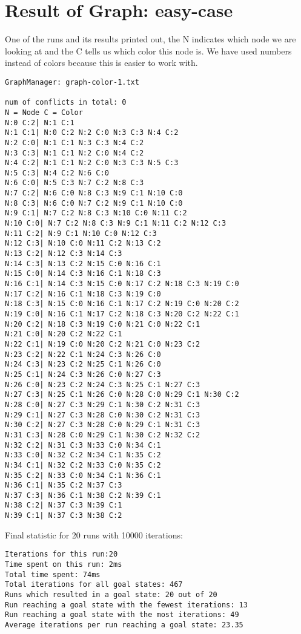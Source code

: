 \documentclass[12pt, a4paper]{article}
\begin{document}
\section{Result of Graph: easy-case}
One of the runs and its results printed out, the N indicates which node we are looking at and the C tells us which color this node is. We have used numbers instead of colors because this is easier to work with.\\
\begin{verbatim}
GraphManager: graph-color-1.txt

num of conflicts in total: 0
N = Node C = Color
N:0 C:2| N:1 C:1 
N:1 C:1| N:0 C:2 N:2 C:0 N:3 C:3 N:4 C:2 
N:2 C:0| N:1 C:1 N:3 C:3 N:4 C:2 
N:3 C:3| N:1 C:1 N:2 C:0 N:4 C:2 
N:4 C:2| N:1 C:1 N:2 C:0 N:3 C:3 N:5 C:3 
N:5 C:3| N:4 C:2 N:6 C:0 
N:6 C:0| N:5 C:3 N:7 C:2 N:8 C:3 
N:7 C:2| N:6 C:0 N:8 C:3 N:9 C:1 N:10 C:0 
N:8 C:3| N:6 C:0 N:7 C:2 N:9 C:1 N:10 C:0 
N:9 C:1| N:7 C:2 N:8 C:3 N:10 C:0 N:11 C:2 
N:10 C:0| N:7 C:2 N:8 C:3 N:9 C:1 N:11 C:2 N:12 C:3 
N:11 C:2| N:9 C:1 N:10 C:0 N:12 C:3 
N:12 C:3| N:10 C:0 N:11 C:2 N:13 C:2 
N:13 C:2| N:12 C:3 N:14 C:3 
N:14 C:3| N:13 C:2 N:15 C:0 N:16 C:1 
N:15 C:0| N:14 C:3 N:16 C:1 N:18 C:3 
N:16 C:1| N:14 C:3 N:15 C:0 N:17 C:2 N:18 C:3 N:19 C:0 
N:17 C:2| N:16 C:1 N:18 C:3 N:19 C:0 
N:18 C:3| N:15 C:0 N:16 C:1 N:17 C:2 N:19 C:0 N:20 C:2 
N:19 C:0| N:16 C:1 N:17 C:2 N:18 C:3 N:20 C:2 N:22 C:1 
N:20 C:2| N:18 C:3 N:19 C:0 N:21 C:0 N:22 C:1 
N:21 C:0| N:20 C:2 N:22 C:1 
N:22 C:1| N:19 C:0 N:20 C:2 N:21 C:0 N:23 C:2 
N:23 C:2| N:22 C:1 N:24 C:3 N:26 C:0 
N:24 C:3| N:23 C:2 N:25 C:1 N:26 C:0 
N:25 C:1| N:24 C:3 N:26 C:0 N:27 C:3 
N:26 C:0| N:23 C:2 N:24 C:3 N:25 C:1 N:27 C:3 
N:27 C:3| N:25 C:1 N:26 C:0 N:28 C:0 N:29 C:1 N:30 C:2 
N:28 C:0| N:27 C:3 N:29 C:1 N:30 C:2 N:31 C:3 
N:29 C:1| N:27 C:3 N:28 C:0 N:30 C:2 N:31 C:3 
N:30 C:2| N:27 C:3 N:28 C:0 N:29 C:1 N:31 C:3 
N:31 C:3| N:28 C:0 N:29 C:1 N:30 C:2 N:32 C:2 
N:32 C:2| N:31 C:3 N:33 C:0 N:34 C:1 
N:33 C:0| N:32 C:2 N:34 C:1 N:35 C:2 
N:34 C:1| N:32 C:2 N:33 C:0 N:35 C:2 
N:35 C:2| N:33 C:0 N:34 C:1 N:36 C:1 
N:36 C:1| N:35 C:2 N:37 C:3 
N:37 C:3| N:36 C:1 N:38 C:2 N:39 C:1 
N:38 C:2| N:37 C:3 N:39 C:1 
N:39 C:1| N:37 C:3 N:38 C:2 
\end{verbatim}

Final statistic for 20 runs with 10000 iterations:
\begin{verbatim}
Iterations for this run:20
Time spent on this run: 2ms
Total time spent: 74ms
Total iterations for all goal states: 467
Runs which resulted in a goal state: 20 out of 20
Run reaching a goal state with the fewest iterations: 13
Run reaching a goal state with the most iterations: 49
Average iterations per run reaching a goal state: 23.35

\end{verbatim}
\end{document}

